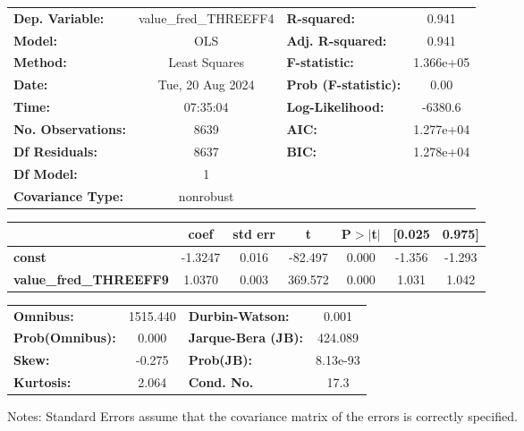 \begin{center}
\begin{tabular}{lclc}
\toprule
\textbf{Dep. Variable:}        & value\_fred\_THREEFF4 & \textbf{  R-squared:         } &     0.941   \\
\textbf{Model:}                &          OLS          & \textbf{  Adj. R-squared:    } &     0.941   \\
\textbf{Method:}               &     Least Squares     & \textbf{  F-statistic:       } & 1.366e+05   \\
\textbf{Date:}                 &    Tue, 20 Aug 2024   & \textbf{  Prob (F-statistic):} &     0.00    \\
\textbf{Time:}                 &        07:35:04       & \textbf{  Log-Likelihood:    } &   -6380.6   \\
\textbf{No. Observations:}     &           8639        & \textbf{  AIC:               } & 1.277e+04   \\
\textbf{Df Residuals:}         &           8637        & \textbf{  BIC:               } & 1.278e+04   \\
\textbf{Df Model:}             &              1        & \textbf{                     } &             \\
\textbf{Covariance Type:}      &       nonrobust       & \textbf{                     } &             \\
\bottomrule
\end{tabular}
\begin{tabular}{lcccccc}
                               & \textbf{coef} & \textbf{std err} & \textbf{t} & \textbf{P$> |$t$|$} & \textbf{[0.025} & \textbf{0.975]}  \\
\midrule
\textbf{const}                 &      -1.3247  &        0.016     &   -82.497  &         0.000        &       -1.356    &       -1.293     \\
\textbf{value\_fred\_THREEFF9} &       1.0370  &        0.003     &   369.572  &         0.000        &        1.031    &        1.042     \\
\bottomrule
\end{tabular}
\begin{tabular}{lclc}
\textbf{Omnibus:}       & 1515.440 & \textbf{  Durbin-Watson:     } &    0.001  \\
\textbf{Prob(Omnibus):} &   0.000  & \textbf{  Jarque-Bera (JB):  } &  424.089  \\
\textbf{Skew:}          &  -0.275  & \textbf{  Prob(JB):          } & 8.13e-93  \\
\textbf{Kurtosis:}      &   2.064  & \textbf{  Cond. No.          } &     17.3  \\
\bottomrule
\end{tabular}
\end{center}

Notes: \newline
 [1] Standard Errors assume that the covariance matrix of the errors is correctly specified.